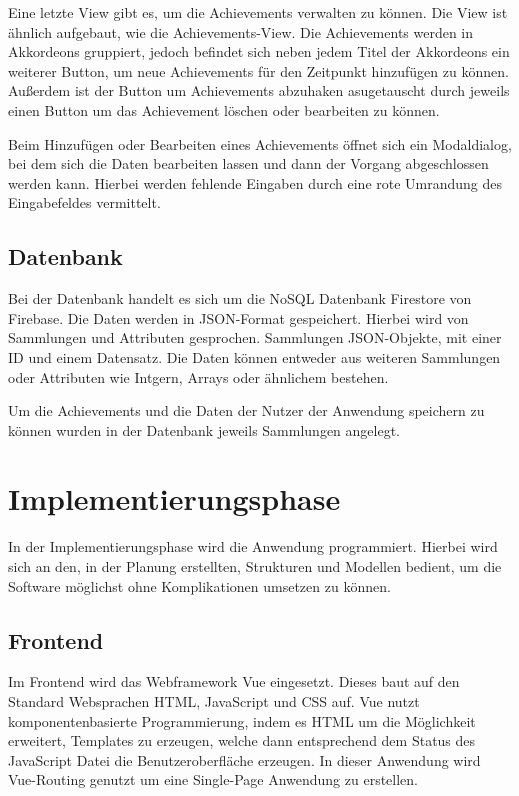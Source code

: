 \documentclass[12pt]{article}
\begin{document}
Eine letzte View gibt es, um die Achievements verwalten zu können.
Die View ist ähnlich aufgebaut, wie die Achievements-View. Die Achievements
werden in Akkordeons gruppiert, jedoch befindet sich neben jedem Titel
der Akkordeons ein weiterer Button, um neue Achievements für den Zeitpunkt
hinzufügen zu können. Außerdem ist der Button um Achievements abzuhaken
asugetauscht durch jeweils einen Button um das Achievement löschen oder 
bearbeiten zu können.

Beim Hinzufügen oder Bearbeiten eines Achievements öffnet sich ein
Modaldialog, bei dem sich die Daten bearbeiten lassen und dann der
Vorgang abgeschlossen werden kann. Hierbei werden fehlende Eingaben durch
eine rote Umrandung des Eingabefeldes vermittelt.


\subsection{Datenbank}

Bei der Datenbank handelt es sich um die NoSQL Datenbank Firestore
von Firebase. Die Daten werden in JSON-Format gespeichert. Hierbei wird
von Sammlungen und Attributen gesprochen. Sammlungen JSON-Objekte, mit einer
ID und einem Datensatz. Die Daten können entweder aus weiteren Sammlungen
oder Attributen wie Intgern, Arrays oder ähnlichem bestehen.

Um die Achievements und die Daten der Nutzer der Anwendung speichern zu können
wurden in der Datenbank jeweils Sammlungen angelegt.


%
%

\section{Implementierungsphase}
In der Implementierungsphase wird die Anwendung programmiert. Hierbei wird sich an den,
in der Planung erstellten, Strukturen und Modellen bedient, um die Software möglichst ohne
Komplikationen umsetzen zu können.

\subsection{Frontend}


Im Frontend wird das Webframework Vue eingesetzt. Dieses baut auf den
Standard Websprachen HTML, JavaScript und CSS auf. Vue nutzt
komponentenbasierte Programmierung, indem es HTML um die Möglichkeit
erweitert, Templates zu erzeugen, welche dann entsprechend dem Status des
JavaScript Datei die Benutzeroberfläche erzeugen.
In dieser Anwendung wird Vue-Routing genutzt um eine Single-Page Anwendung zu
erstellen. 
\end{document}
